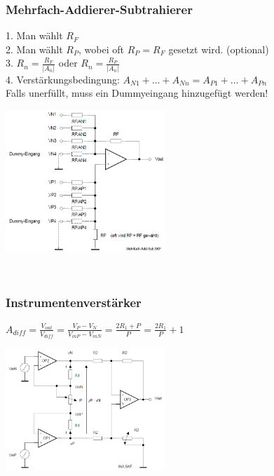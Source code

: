 		\subsubsection{Mehrfach-Addierer-Subtrahierer} 		
		\begin{minipage}[b]{12cm}
		1. Man wählt $R_{F}$\\
		2. Man wählt $R_{P}$, wobei oft $R_{P}=R_{F}$ gesetzt wird. (optional)\\
		3. $R_{n}=\frac{R_{F}}{\left|A_{n}\right|}$ oder
			$R_{n}=\frac{R_{P}}{\left|A_{n}\right|}$\\ 
		4. Verstärkungsbedingung: $A_{N1} +
		\ldots + A_{Nn} = A_{P1} + \ldots + A_{Pn}$ \\Falls unerfüllt, muss ein Dummyeingang hinzugefügt werden!
		\end{minipage}
		\begin{minipage}{6cm}
          	\includegraphics[width=6cm]{./images/mehrfach-addierer-subtrahierer.png} 
        \end{minipage}\\

		\subsubsection{Instrumentenverstärker}
		\begin{minipage}[b]{12cm}
		$A_{diff}=\frac{V_{out}}{V_{diff}}=\frac{V_{P}-V_{N}}{V_{inP}-V_{inN}}
		=\frac{2R_{1}+P}{P}=\frac{2R_{1}}{P}+1$\\
		\end{minipage}
		\begin{minipage}{6cm}
          	\includegraphics[width=6cm]{./images/Instrumentationsverstaerker.png} 
        \end{minipage}\\

